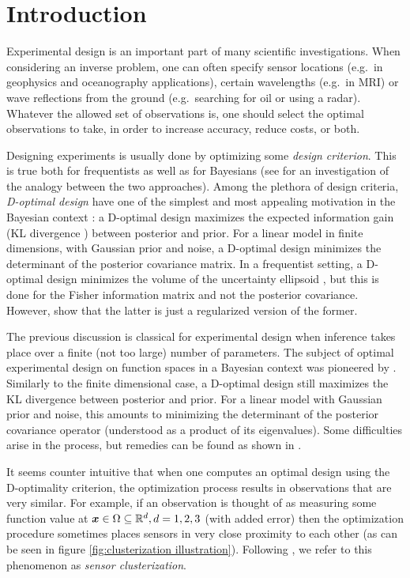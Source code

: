 \section{Introduction}\label{section:OED intro}
Experimental design is an important part of many scientific
investigations. When considering an inverse problem, one can often
specify sensor locations (e.g.\ in geophysics and oceanography
applications), certain wavelengths (e.g.\ in MRI) or wave reflections
from the ground (e.g.\ searching for oil or using a radar). Whatever
the allowed set of observations is, one should select the optimal
observations to take, in order to increase accuracy, reduce costs, or
both.

Designing experiments is usually done by optimizing some \emph{design
criterion}. This is true both for frequentists
\cite{silvey2013,Ucinski05} as well as for Bayesians
\cite{Chaloner1995} (see \cite{Chaloner1995} for an investigation of
the analogy between the two approaches). Among the plethora of design
criteria, \emph{D-optimal design} have one of the simplest and most
appealing motivation in the Bayesian context \cite{Chaloner1995}: a
D-optimal design maximizes the expected information gain (KL
divergence \cite{CoverThomas91}) between posterior and prior. For a
linear model in finite dimensions, with Gaussian prior and noise, a
D-optimal design minimizes the determinant of the posterior covariance
matrix. In a frequentist setting, a D-optimal design minimizes the
volume of the uncertainty ellipsoid \cite[page 16]{Ucinski05}, but
this is done for the Fisher information matrix and not the posterior
covariance. However, \cite{Chaloner1995} show that the latter is just
a regularized version of the former.

The previous discussion is classical for experimental design when
inference takes place over a finite (not too large) number of
parameters. The subject of optimal experimental design on function
spaces in a Bayesian context was pioneered by
\cite{AlexanderianGloorGhattas14, AlexanderianPetraStadlerEtAl16,
  AlexanderianPetraStadlerEtAl14}. Similarly to the finite dimensional
case, a D-optimal design still maximizes the KL divergence between
posterior and prior. For a linear model with Gaussian prior and noise,
this amounts to minimizing the determinant of the posterior covariance
operator (understood as a product of its eigenvalues). Some
difficulties arise in the process, but remedies can be found as shown
in \cite{AlexanderianGloorGhattas14}.

It seems counter intuitive that when one computes an optimal design
using the D-optimality criterion, the optimization process results in
observations that are very similar. For example, if an observation is
thought of as measuring some function value at ${\boldsymbol{x}} \in \Omega
\subseteq \mathbb{R}^d, d=1,2,3$ (with added error) then the optimization
procedure sometimes places sensors in very close proximity to each
other (as can be seen in figure \ref{fig:clusterization
  illustration}). Following \cite{Ucinski05}, we refer to this
phenomenon as \emph{sensor clusterization}.

